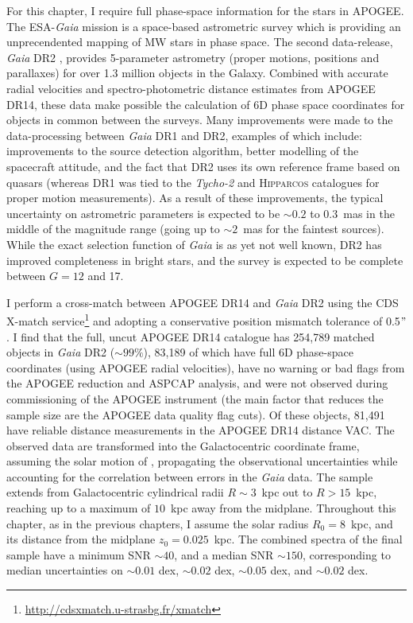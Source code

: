For this chapter, I require full phase-space information for the stars in APOGEE. The ESA-\emph{Gaia} mission is a space-based astrometric survey
which is providing an unprecendented mapping of MW stars in phase
space. The second data-release, \emph{Gaia} DR2
\citep{2018arXiv180409365G}, provides 5-parameter astrometry (proper
motions, positions and parallaxes) for over 1.3 million objects in
the Galaxy.  Combined with accurate radial velocities and
spectro-photometric distance estimates from APOGEE DR14, these data
make possible the calculation of 6D phase space coordinates for
objects in common between the surveys.  Many improvements were made to the
data-processing between \emph{Gaia} DR1 \citep{2016arXiv160904303L}
and DR2, examples of which include: improvements to the source
detection algorithm, better modelling of the spacecraft attitude,
and the fact that DR2 uses its own reference frame based on quasars
(whereas DR1 was tied to the \emph{Tycho-2} and \textsc{Hipparcos}
catalogues for proper motion measurements). As a result of these
improvements, the typical uncertainty on astrometric parameters
is expected to be $\sim 0.2$ to $0.3$~mas in the middle of the
magnitude range (going up to $\sim 2$~mas for the faintest sources).
While the exact selection function of \emph{Gaia} is as yet not
well known, DR2 has improved completeness in bright stars, and the
survey is expected to be complete between $G=12$ and 17.

I perform a cross-match between APOGEE DR14 and \emph{Gaia} DR2
using the CDS X-match
service\footnote{\url{http://cdsxmatch.u-strasbg.fr/xmatch}} and
adopting a conservative position mismatch tolerance of 0.5$"$.  I
find that the full, uncut APOGEE
DR14 catalogue has 254,789 matched objects in \emph{Gaia} DR2 ($\sim
99\%$), 83,189 of which have full 6D phase-space coordinates (using
APOGEE radial velocities), have no warning or bad flags from the
APOGEE reduction and ASPCAP analysis, and were not observed during
commissioning of the APOGEE instrument (the main factor
that reduces the sample size are the APOGEE data quality flag cuts).
Of these objects, 81,491 have reliable distance measurements in the
APOGEE DR14 distance VAC.  The observed data are transformed into the
Galactocentric coordinate frame, assuming the solar motion of
\citet{2010MNRAS.403.1829S}, propagating the observational uncertainties
while accounting for the correlation between errors in the \emph{Gaia}
data. The sample extends from Galactocentric cylindrical radii $R
\sim 3$~kpc out to $ R > 15$~kpc, reaching up to a maximum of
$10$~kpc away from the midplane. Throughout this chapter, as in the previous chapters, I assume
the solar radius $R_0 = 8$~kpc, and its distance from the midplane
$z_0 = 0.025$~kpc. The combined spectra of the final sample
have a minimum SNR $\sim 40$, and a median SNR $\sim 150$, corresponding
to median uncertainties on \feh{} $\sim 0.01$ dex, \mgfe{} $\sim
0.02$ dex, \alfe{} $\sim 0.05$ dex, and \nife{} $\sim 0.02$ dex.

